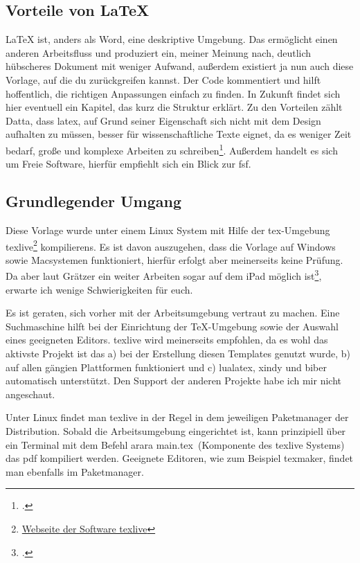 \subsection{Vorteile von LaTeX}
\label{sec:vort-von}
LaTeX ist, anders als Word, eine deskriptive Umgebung. Das ermöglicht einen anderen Arbeitsfluss und produziert ein, meiner Meinung nach, deutlich hübscheres Dokument mit weniger Aufwand, außerdem existiert ja nun auch diese Vorlage, auf die du zurückgreifen kannst. Der Code kommentiert und hilft hoffentlich, die richtigen Anpassungen einfach zu finden. In Zukunft findet sich hier eventuell ein Kapitel, das kurz die Struktur erklärt. 
Zu den Vorteilen zählt Datta, dass \gls{latex}, auf Grund seiner Eigenschaft sich nicht mit dem Design aufhalten zu müssen, besser für wissenschaftliche Texte eignet, da es weniger Zeit bedarf, große und komplexe Arbeiten zu schreiben\footcite[Vgl. ][S. 1f.]{dilipLatex24Hours2017}.
Außerdem handelt es sich um Freie Software, hierfür empfiehlt sich ein Blick zur \gls{fsf}.

\subsection{Grundlegender Umgang}
\label{sec:grundl}
Diese Vorlage wurde unter einem Linux System mit Hilfe der \gls{tex}-Umgebung texlive\footnote{\href{https://tug.org/texlive/}{Webseite der Software texlive}} \glspl{kompilieren}. Es ist davon auszugehen, dass die Vorlage auf Windows sowie Macsystemen funktioniert, hierfür erfolgt aber meinerseits keine Prüfung. Da aber laut Grätzer ein weiter Arbeiten sogar auf dem iPad möglich ist\footcite[Vgl. ][S. 179ff.]{gratzerPracticalLatex2014}, erwarte ich wenige Schwierigkeiten für euch.

Es ist geraten, sich vorher mit der Arbeitsumgebung vertraut zu machen. Eine Suchmaschine hilft bei der Einrichtung der TeX-Umgebung sowie der Auswahl eines geeigneten Editors. texlive wird meinerseits empfohlen, da es wohl das aktivste Projekt ist das a) bei der Erstellung diesen Templates genutzt wurde, b) auf allen gängien Plattformen funktioniert und c) lualatex, xindy und biber automatisch unterstützt. Den Support der anderen Projekte habe ich mir nicht angeschaut.

Unter Linux findet man texlive in der Regel in dem jeweiligen Paketmanager der Distribution. Sobald die Arbeitsumgebung eingerichtet ist, kann prinzipiell über ein Terminal mit dem Befehl \glqq arara main.tex\grqq\ (Komponente des texlive Systems) das pdf kompiliert werden.
Geeignete Editoren, wie zum Beispiel texmaker, findet man ebenfalls im Paketmanager.


